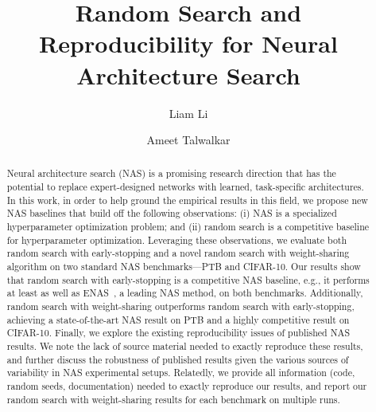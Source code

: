 \documentclass[acmlarge, nonacm]{acmart}
\begin{document}
\title{Random Search and Reproducibility for Neural Architecture Search}

\author{Liam Li}

\author{Ameet Talwalkar}

\renewcommand{\shortauthors}{Li and Talwalkar}

\begin{abstract}
Neural architecture search (NAS) 
is a promising research direction that 
has the potential to 
replace expert-designed networks with learned, task-specific architectures.  
In this work, in order to help ground the empirical results in this field,  we  propose new NAS baselines that build off the following observations: (i) NAS is 
a specialized hyperparameter optimization problem; and (ii) random search is a competitive baseline for hyperparameter optimization. Leveraging these observations, 
we evaluate both random search with early-stopping and a novel random search with weight-sharing algorithm on two standard NAS benchmarks---PTB and CIFAR-10.  Our results show that random search with early-stopping is a competitive NAS baseline, e.g., it performs at least as well as ENAS~\citep{pham18ENAS}, a leading NAS method, on both benchmarks.
Additionally, random search with weight-sharing outperforms random search with early-stopping, achieving a state-of-the-art NAS result on PTB and a highly competitive result on CIFAR-10.
Finally, we explore the existing reproducibility issues of published NAS results. We note the lack of source material needed to exactly reproduce these results, and further discuss the robustness of published results given the various 
sources of variability in NAS experimental setups. Relatedly, we provide all information (code, random seeds, documentation) needed to exactly reproduce our results, and report our random search with weight-sharing results for each benchmark on multiple runs.
\end{abstract}


\maketitle
\end{document}

